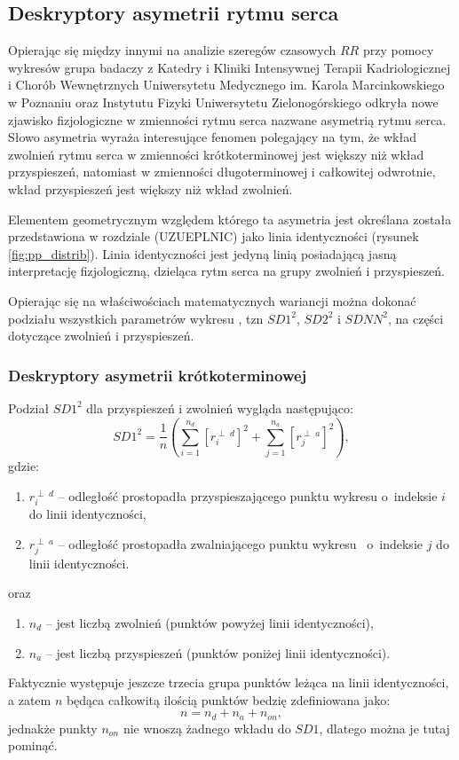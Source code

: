 \subsection{Deskryptory asymetrii rytmu serca}

Opierając się między innymi na analizie szeregów czasowych $RR$ przy pomocy wykresów \PP{}
grupa badaczy z Katedry i Kliniki Intensywnej Terapii Kadriologicznej i Chorób Wewnętrznych
Uniwersytetu Medycznego im. Karola Marcinkowskiego w Poznaniu oraz Instytutu Fizyki
Uniwersytetu Zielonogórskiego odkryła nowe zjawisko fizjologiczne w zmienności rytmu serca
nazwane asymetrią rytmu serca. Słowo asymetria wyraża interesujące fenomen polegający na
tym, że wkład zwolnień rytmu serca w zmienności krótkoterminowej jest większy niż wkład
przyspieszeń, natomiast w zmienności długoterminowej i całkowitej odwrotnie, wkład
przyspieszeń jest większy niż wkład zwolnień.

Elementem geometrycznym względem którego ta asymetria jest określana została przedstawiona
w rozdziale (UZUEPLNIC) jako linia identyczności (rysunek \ref{fig:pp_distrib}). Linia identyczności jest jedyną linią posiadającą jasną interpretację fizjologiczną, dzieląca
rytm serca na grupy zwolnień i przyspieszeń.

Opierając się na właściwościach matematycznych wariancji można dokonać podziału wszystkich
parametrów wykresu \PP{}, tzn $SD1^2$, $SD2^2$ i $SDNN^2$, na części dotyczące zwolnień i 
przyspieszeń.

\subsubsection{Deskryptory asymetrii krótkoterminowej}
Podział $SD1^2$ dla przyspieszeń i zwolnień wygląda następująco:
\begin{equation}
SD1^2=\frac{1}{n}\left(\sum_{i=1}^{n_{d}}[r^{\perp\;d}_{i}]^{2}+\sum_{j=1}^{n_{a}}[r^{\perp\;a}_{j}]^{2}\right),\label{SD1_podzial}
\end{equation}
gdzie:
\begin{enumerate}
\item[]$r^{\perp\;d}_{i}$ -- odległość prostopadła przyspieszającego punktu  wykresu \linebreak \PP{} o~indeksie $i$ do linii identyczności,
\item[]$r^{\perp\;a}_{j}$ -- odległość prostopadła zwalniającego punktu wykresu \PP\ o~indeksie $j$ do linii identyczności.
\end{enumerate}
oraz
\begin{enumerate}
\item[]$n_{d}$ -- jest liczbą zwolnień (punktów powyżej linii identyczności),
\item[]$n_{a}$ -- jest liczbą przyspieszeń (punktów poniżej linii identyczności).
\end{enumerate}
Faktycznie występuje jeszcze trzecia grupa punktów leżąca na linii identyczności, a zatem
$n$ będąca całkowitą ilością punktów bedzię zdefiniowana jako:
\begin{equation}
n=n_{d}+n_{a}+n_{on} \label{nki},
\end{equation}
jednakże punkty $n_{on}$ nie wnoszą żadnego wkładu do $SD1$, dlatego można je tutaj pominąć.

